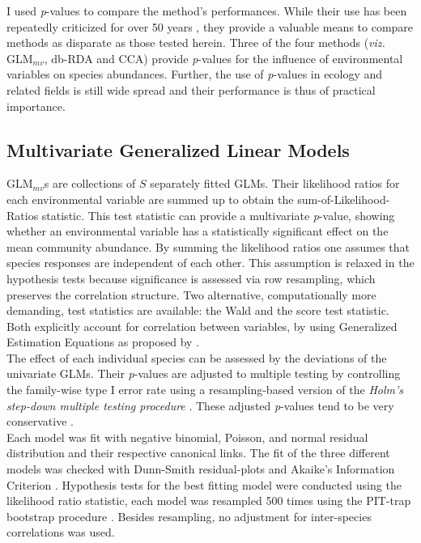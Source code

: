 		I used \textit{p}-values to compare the method's performances. While their use has been repeatedly criticized for over 50 years \citep[e.g.][]{rozeboom1960fallacy}, they provide a valuable means to compare methods as disparate as those tested herein. 
		Three of the four methods (\textit{viz.} GLM$_{mv}$, db-RDA and CCA) provide \textit{p}-values for the influence of environmental variables on species abundances. Further, the use of \textit{p}-values in ecology and related fields is still wide spread \citep{FIDLER2006} and their performance is thus of practical importance. \\


	\subsection{Multivariate Generalized Linear Models}

		GLM$_{mv}$s are collections of $S$ separately fitted GLMs. 
		Their likelihood ratios for each environmental variable are summed up to obtain the sum-of-Likelihood-Ratios statistic. 
		This test statistic can provide a multivariate \textit{p}-value, showing whether an environmental variable has a statistically significant effect on the mean community abundance. 
		By summing the likelihood ratios one assumes that species responses are independent of each other. 
		This assumption is relaxed in the hypothesis tests because significance is assessed via row resampling, which preserves the correlation structure. 
		Two alternative, computationally more demanding, test statistics are available: the Wald and the score test statistic. 
		Both explicitly account for correlation between variables, by using Generalized Estimation Equations as proposed by \citet{Warton2011a}.\\ 
		The effect of each individual species can be assessed by the deviations of the univariate GLMs. 
		Their \textit{p}-values are adjusted to multiple testing by controlling the family-wise type I error rate using a resampling-based version of the \textit{Holm's step-down multiple testing procedure} \citep{Westfall1993}. 
		These adjusted \textit{p}-values tend to be very conservative \citep{Warton2018}. \\
		
		Each model was fit with negative binomial, Poisson, and normal residual distribution and their respective canonical links.
		The fit of the three different models was checked with Dunn-Smith residual-plots and Akaike's Information Criterion \citep[AIC, ][]{akaike1974new}.
		Hypothesis tests for the best fitting model were conducted using the likelihood ratio statistic, each model was resampled 500 times using the PIT-trap bootstrap procedure \citep{Warton2017}.
		Besides resampling, no adjustment for inter-species correlations was used.\\

